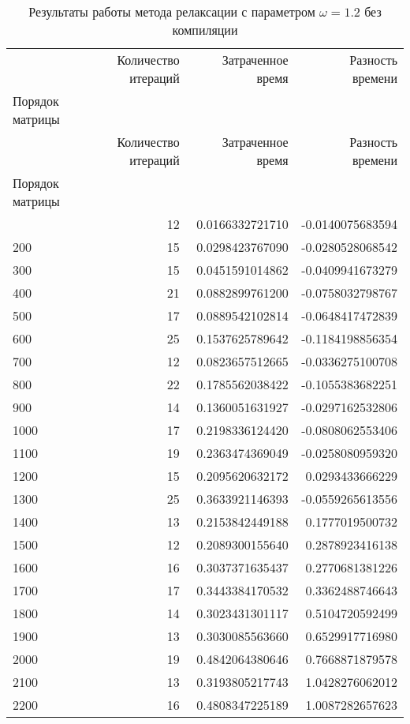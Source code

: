 \begin{longtable}{lrrr}
\caption{Результаты работы метода релаксации с параметром $\omega=1.2$ без компиляции}\\
\toprule
 & Количество итераций & Затраченное время & Разность времени \\
Порядок матрицы &  &  &  \\
\midrule
\endfirsthead
\toprule
 & Количество итераций & Затраченное время & Разность времени \\
Порядок матрицы &  &  &  \\
\midrule
\endhead
\midrule
\midrule
\endfoot
\bottomrule
\endlastfoot
100 & 12 & 0.0166332721710 & -0.0140075683594 \\
200 & 15 & 0.0298423767090 & -0.0280528068542 \\
300 & 15 & 0.0451591014862 & -0.0409941673279 \\
400 & 21 & 0.0882899761200 & -0.0758032798767 \\
500 & 17 & 0.0889542102814 & -0.0648417472839 \\
600 & 25 & 0.1537625789642 & -0.1184198856354 \\
700 & 12 & 0.0823657512665 & -0.0336275100708 \\
800 & 22 & 0.1785562038422 & -0.1055383682251 \\
900 & 14 & 0.1360051631927 & -0.0297162532806 \\
1000 & 17 & 0.2198336124420 & -0.0808062553406 \\
1100 & 19 & 0.2363474369049 & -0.0258080959320 \\
1200 & 15 & 0.2095620632172 & 0.0293433666229 \\
1300 & 25 & 0.3633921146393 & -0.0559265613556 \\
1400 & 13 & 0.2153842449188 & 0.1777019500732 \\
1500 & 12 & 0.2089300155640 & 0.2878923416138 \\
1600 & 16 & 0.3037371635437 & 0.2770681381226 \\
1700 & 17 & 0.3443384170532 & 0.3362488746643 \\
1800 & 14 & 0.3023431301117 & 0.5104720592499 \\
1900 & 13 & 0.3030085563660 & 0.6529917716980 \\
2000 & 19 & 0.4842064380646 & 0.7668871879578 \\
2100 & 13 & 0.3193805217743 & 1.0428276062012 \\
2200 & 16 & 0.4808347225189 & 1.0087282657623 \\

\end{longtable}
